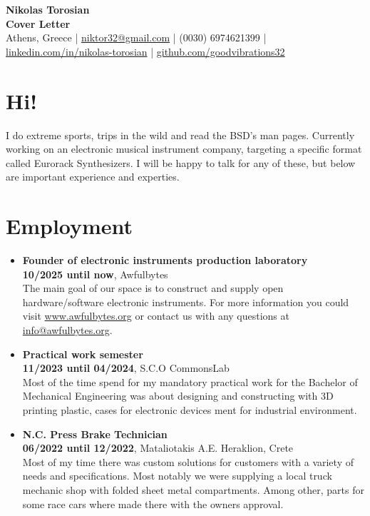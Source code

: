 \documentclass[a4paper,9pt]{extarticle}
\begin{document}
\pagestyle{empty}

\begin{center}
\textbf{\Large Nikolas Torosian }\\[3pt] %
\textbf{Cover Letter}\\[1pt] %
Athens, Greece
| \href{mailto:niktor32@gmail.com}{niktor32@gmail.com} | (0030) 6974621399 | \href{https://www.linkedin.com/in/nikolas-torosian-700235273/}{linkedin.com/in/nikolas-torosian} | \href{https://github.com/goodvibrations32/}{github.com/goodvibrations32}   %
\end{center}

\section*{Hi!}
I do extreme sports, trips in the wild and read the BSD's man pages. Currently
working on an electronic musical instrument company, targeting a specific format called Eurorack
Synthesizers. I will be happy to talk for any of these, but below are important experience and experties.\\
\section*{Employment}
\noindent
\begin{itemize}
\item{\textbf{Founder of electronic instruments production laboratory}}\\
  \textbf{10/2025 until now}, Awfulbytes\\
  The main goal of our space is to construct and supply open hardware/software electronic
  instruments. For more information you could visit \href{https://awfulbytes.org}{www.awfulbytes.org}
  or contact us with any questions at \href{maito:info@awfulbytes.org}{info@awfulbytes.org}.\\
\item{\textbf{Practical work semester}}\\
  \textbf{11/2023 until 04/2024}, S.C.O CommonsLab\\
  Most of the time spend for my mandatory practical work for the Bachelor of Mechanical
  Engineering was about designing and constructing with 3D printing plastic, cases for
  electronic devices ment for industrial environment. \\
\item{\textbf{N.C. Press Brake Technician}} \\
  \textbf{06/2022 until 12/2022}, Mataliotakis A.E. Heraklion, Crete \\
  Most of my time there was custom solutions for customers with a variety of needs and
  specifications. Most notably we were supplying a local truck mechanic shop with
  folded sheet metal compartments. Among other, parts for some race cars where made
  there with the owners approval.\\
\end{itemize}
\end{document}

